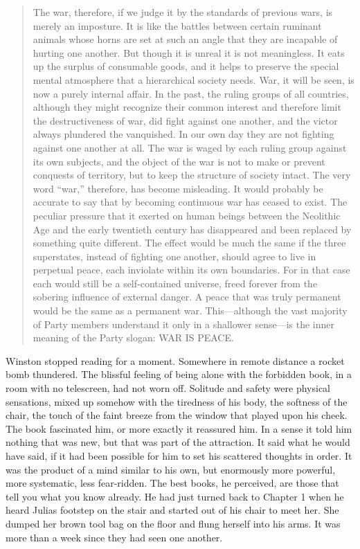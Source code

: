\begin{quotation}
The war, therefore, if we judge it by the standards of previous wars, is
merely an imposture. It is like the battles between certain ruminant
animals whose horns are set at such an angle that they are incapable of
hurting one another. But though it is unreal it is not meaningless. It
eats up the surplus of consumable goods, and it helps to preserve the
special mental atmosphere that a hierarchical society needs. War, it
will be seen, is now a purely internal affair. In the past, the ruling
groups of all countries, although they might recognize their common
interest and therefore limit the destructiveness of war, did fight
against one another, and the victor always plundered the vanquished. In
our own day they are not fighting against one another at all. The war is
waged by each ruling group against its own subjects, and the object of
the war is not to make or prevent conquests of territory, but to keep
the structure of society intact. The very word ``war,'' therefore, has
become misleading. It would probably be accurate to say that by becoming
continuous war has ceased to exist. The peculiar pressure that it
exerted on human beings between the Neolithic Age and the early
twentieth century has disappeared and been replaced by something quite
different. The effect would be much the same if the three superstates,
instead of fighting one another, should agree to live in perpetual
peace, each inviolate within its own boundaries. For in that case each
would still be a self-contained universe, freed forever from the
sobering influence of external danger. A peace that was truly permanent
would be the same as a permanent war. This---although the vast majority
of Party members understand it only in a shallower sense---is the inner
meaning of the Party slogan: \textsc{WAR IS PEACE}.
\end{quotation}

Winston stopped reading for a moment. Somewhere in remote distance a
rocket bomb thundered. The blissful feeling of being alone with the
forbidden book, in a room with no telescreen, had not worn off. Solitude
and safety were physical sensations, mixed up somehow with the tiredness
of his body, the softness of the chair, the touch of the faint breeze
from the window that played upon his cheek. The book fascinated him, or
more exactly it reassured him. In a sense it told him nothing that was
new, but that was part of the attraction. It said what he would have
said, if it had been possible for him to set his scattered thoughts in
order. It was the product of a mind similar to his own, but enormously
more powerful, more systematic, less fear-ridden. The best books, he
perceived, are those that tell you what you know already. He had just
turned back to Chapter 1 when he heard Julia\textquotesingle s footstep
on the stair and started out of his chair to meet her. She dumped her
brown tool bag on the floor and flung herself into his arms. It was more
than a week since they had seen one another.

